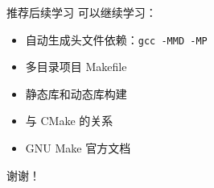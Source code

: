 \documentclass[aspectratio=169]{ctexbeamer}
\begin{document}
\begin{frame}[fragile]{推荐后续学习}
可以继续学习：

\begin{itemize}
  \item 自动生成头文件依赖：\texttt{gcc -MMD -MP}
  \item 多目录项目 Makefile
  \item 静态库和动态库构建
  \item 与 CMake 的关系
  \item GNU Make 官方文档
\end{itemize}

\vspace{1em}

\begin{center}
\Large 谢谢！
\end{center}
\end{frame}
\end{document}
